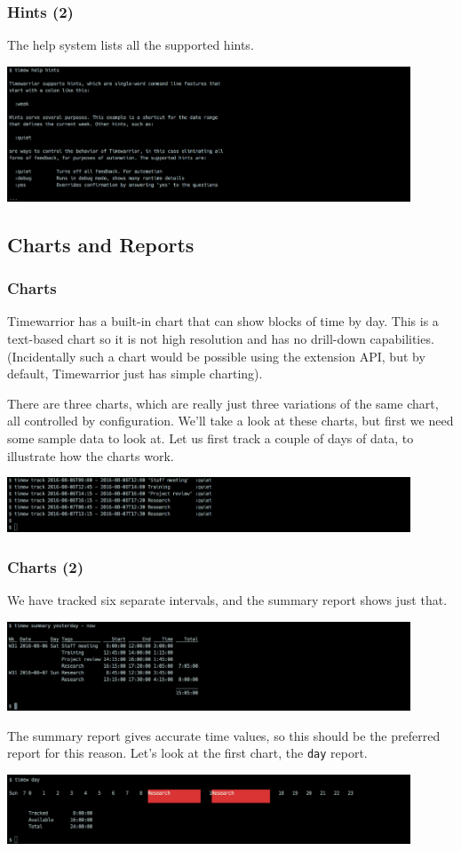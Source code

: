 \documentclass[t,handout]{beamer}
\begin{document}
\begin{frame}[fragile]\frametitle{Hints (2)}
    \vfill
    The help system lists all the supported hints.

    \includegraphics[width=12cm]{images/tutorial23.png}
\end{frame}

\subsection{Charts and Reports}

\begin{frame}[fragile]\frametitle{Charts}
    \vfill
    Timewarrior has a built-in chart that can show blocks of time by day. This is a text-based chart so it is not high resolution and has no drill-down capabilities. (Incidentally such a chart would be possible using the extension API, but by default, Timewarrior just has simple charting).

    There are three charts, which are really just three variations of the same chart, all controlled by configuration. We'll take a look at these charts, but first we need some sample data to look at.  Let us first track a couple of days of data, to illustrate how the charts work.

    \includegraphics[width=12cm]{images/tutorial24.png}
\end{frame}

\begin{frame}[fragile]\frametitle{Charts (2)}
    \vfill
    We have tracked six separate intervals, and the summary report shows just that.

    \includegraphics[width=12cm]{images/tutorial25.png}

    The summary report gives accurate time values, so this should be the preferred report for this reason. Let's look at the first chart, the \verb=day= report.

    \includegraphics[width=12cm]{images/tutorial26.png}
\end{frame}
\end{document}
